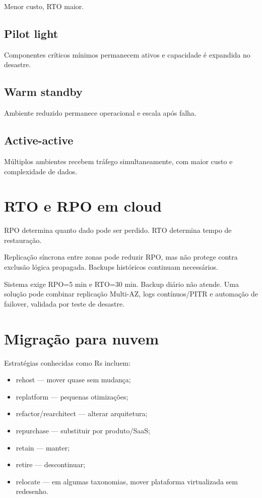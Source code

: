 Menor custo, RTO maior.

\subsection{Pilot light}

Componentes críticos mínimos permanecem ativos e capacidade é expandida no desastre.

\subsection{Warm standby}

Ambiente reduzido permanece operacional e escala após falha.

\subsection{Active-active}

Múltiplos ambientes recebem tráfego simultaneamente, com maior custo e complexidade de dados.

\section{RTO e RPO em cloud}

RPO determina quanto dado pode ser perdido. RTO determina tempo de restauração.

Replicação síncrona entre zonas pode reduzir RPO, mas não protege contra exclusão lógica propagada. Backups históricos continuam necessários.

\begin{exemplo}
Sistema exige RPO=5 min e RTO=30 min. Backup diário não atende. Uma solução pode combinar replicação Multi-AZ, logs contínuos/PITR e automação de failover, validada por teste de desastre.
\end{exemplo}

\section{Migração para nuvem}

Estratégias conhecidas como Rs incluem:
\begin{itemize}
\item rehost — mover quase sem mudança;
\item replatform — pequenas otimizações;
\item refactor/rearchitect — alterar arquitetura;
\item repurchase — substituir por produto/SaaS;
\item retain — manter;
\item retire — descontinuar;
\item relocate — em algumas taxonomias, mover plataforma virtualizada sem redesenho.
\end{itemize}

